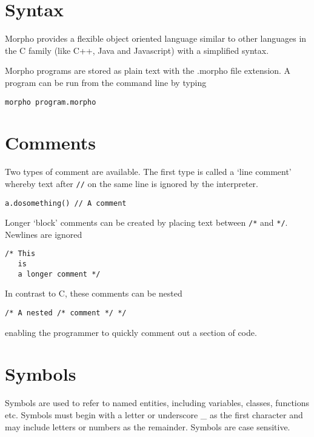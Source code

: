 \hypertarget{syntax}{%
\section{Syntax}\label{syntax}}

Morpho provides a flexible object oriented language similar to other
languages in the C family (like C++, Java and Javascript) with a
simplified syntax.

Morpho programs are stored as plain text with the .morpho file
extension. A program can be run from the command line by typing

\begin{lstlisting}
morpho program.morpho
\end{lstlisting}

\hypertarget{comments}{%
\section{Comments}\label{comments}}

Two types of comment are available. The first type is called a `line
comment' whereby text after \texttt{//} on the same line is ignored by
the interpreter.

\begin{lstlisting}
a.dosomething() // A comment
\end{lstlisting}

Longer `block' comments can be created by placing text between
\texttt{/*} and \texttt{*/}. Newlines are ignored

\begin{lstlisting}
/* This
   is
   a longer comment */
\end{lstlisting}

In contrast to C, these comments can be nested

\begin{lstlisting}
/* A nested /* comment */ */
\end{lstlisting}

enabling the programmer to quickly comment out a section of code.

\hypertarget{symbols}{%
\section{Symbols}\label{symbols}}

Symbols are used to refer to named entities, including variables,
classes, functions etc. Symbols must begin with a letter or underscore
\_ as the first character and may include letters or numbers as the
remainder. Symbols are case sensitive.


